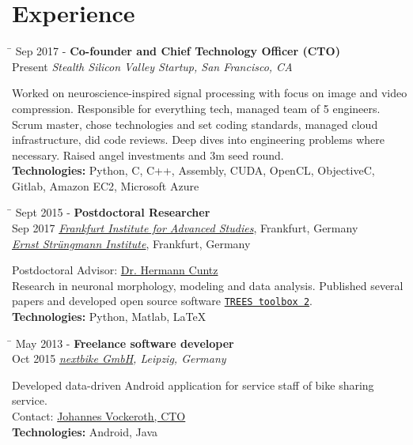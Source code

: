 \documentclass[10pt]{article} %
\newlength{\smallertextwidth}
\newcommand{\job}[5]{
\begin{tabbing}
\hspace{2.2cm} \= \kill
{#1} \> \textbf{#3}\\
{#2} \>\+ \textit{#4}\\[3pt]
\begin{minipage}{\smallertextwidth}
\vspace{2mm}
#5
\end{minipage}
\end{tabbing}
\vspace{2mm}
}
\begin{document}

\section{Experience}

\job
{Sep 2017 -}{Present}
{Co-founder and Chief Technology Officer (CTO)}
{Stealth Silicon Valley Startup\textup{, San Francisco, CA}}
{
Worked on neuroscience-inspired signal processing with focus on image and video compression. 
Responsible for everything tech, managed team of 5 engineers. Scrum master, chose technologies and
set coding standards, managed cloud infrastructure, did code reviews. Deep dives into engineering
problems where necessary. Raised angel investments and 3m seed round.\\[5pt]
\textbf{Technologies:} Python, C, C++, Assembly, CUDA, OpenCL, ObjectiveC, Gitlab, Amazon EC2, Microsoft Azure
}

\begin{tabbing}
  \hspace{2.2cm} \= \kill
  {Sept 2015 -} \> \textbf{Postdoctoral Researcher}\\
  {Sep 2017} \> \textit{\href{https://fias.institute}{Frankfurt Institute for Advanced Studies}}, Frankfurt, Germany\\
  \>\+ \textit{\href{http://www.esi-frankfurt.de}{Ernst Strüngmann Institute}}, Frankfurt, Germany\\[3pt]
  \begin{minipage}{\smallertextwidth}
    \vspace{2mm}
    Postdoctoral Advisor: \href{https://www.fias.science/de/neurowissenschaften/gruppen/hermann-cuntz/}{Dr. Hermann Cuntz}\\
    Research in neuronal morphology, modeling and data analysis. Published several papers and developed
    open source software \href{https://www.treestoolbox.org/}{\texttt{TREES toolbox 2}}.\\[5pt]
    \textbf{Technologies:} Python, Matlab, LaTeX  
  \end{minipage}
\end{tabbing}
\vspace{2mm}
  

\job
{May 2013 -}{Oct 2015}
{Freelance software developer}
{\href{https://nextbike.com}{nextbike GmbH}\textup{, Leipzig, Germany}}
{
  Developed data-driven Android application for service staff of bike sharing service.\\
  Contact: \href{https://www.linkedin.com/in/johannes-vockeroth-8885709a/}{Johannes Vockeroth, CTO}\\[5pt]
  \textbf{Technologies:} Android, Java
}
  
\end{document}
